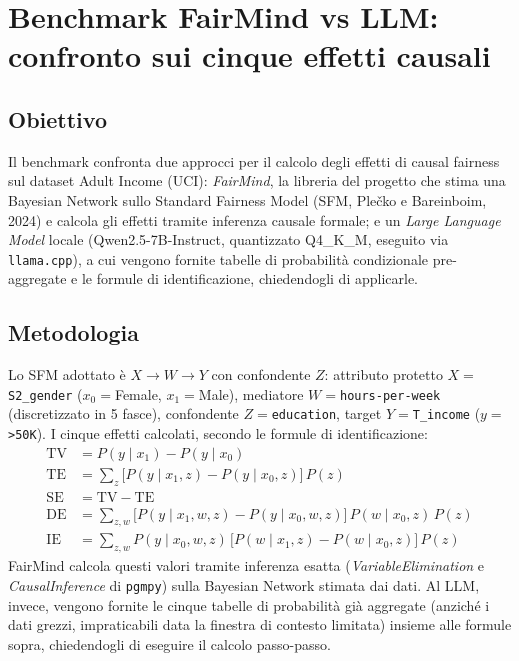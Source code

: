 
\section{Benchmark FairMind vs LLM: confronto sui cinque effetti causali}
\label{sec:fairmind-llm-methodology}

\subsection*{Obiettivo}

Il benchmark confronta due approcci per il calcolo degli effetti di causal fairness sul dataset Adult Income (UCI): \emph{FairMind}, la libreria del progetto che stima una Bayesian Network sullo Standard Fairness Model (SFM, Ple\v{c}ko e Bareinboim, 2024) e calcola gli effetti tramite inferenza causale formale; e un \emph{Large Language Model} locale (Qwen2.5-7B-Instruct, quantizzato Q4\_K\_M, eseguito via \texttt{llama.cpp}), a cui vengono fornite tabelle di probabilit\`a condizionale pre-aggregate e le formule di identificazione, chiedendogli di applicarle.

\subsection*{Metodologia}

Lo SFM adottato \`e $X \to W \to Y$ con confondente $Z$: attributo protetto $X{=}$\texttt{S2\_gender} ($x_0{=}$Female, $x_1{=}$Male), mediatore $W{=}$\texttt{hours-per-week} (discretizzato in 5 fasce), confondente $Z{=}$\texttt{education}, target $Y{=}$\texttt{T\_income} ($y{=}$\,\texttt{>50K}). I cinque effetti calcolati, secondo le formule di identificazione:
\begin{align*}
\text{TV} &= P(y \mid x_1) - P(y \mid x_0) \\
\text{TE} &= \textstyle\sum_z \big[P(y \mid x_1, z) - P(y \mid x_0, z)\big] \, P(z) \\
\text{SE} &= \text{TV} - \text{TE} \\
\text{DE} &= \textstyle\sum_{z,w} \big[P(y \mid x_1, w, z) - P(y \mid x_0, w, z)\big] \, P(w \mid x_0, z) \, P(z) \\
\text{IE} &= \textstyle\sum_{z,w} P(y \mid x_0, w, z) \, \big[P(w \mid x_1, z) - P(w \mid x_0, z)\big] \, P(z)
\end{align*}
FairMind calcola questi valori tramite inferenza esatta (\emph{VariableElimination} e \emph{CausalInference} di \texttt{pgmpy}) sulla Bayesian Network stimata dai dati. Al LLM, invece, vengono fornite le cinque tabelle di probabilit\`a gi\`a aggregate (anzich\'e i dati grezzi, impraticabili data la finestra di contesto limitata) insieme alle formule sopra, chiedendogli di eseguire il calcolo passo-passo.

